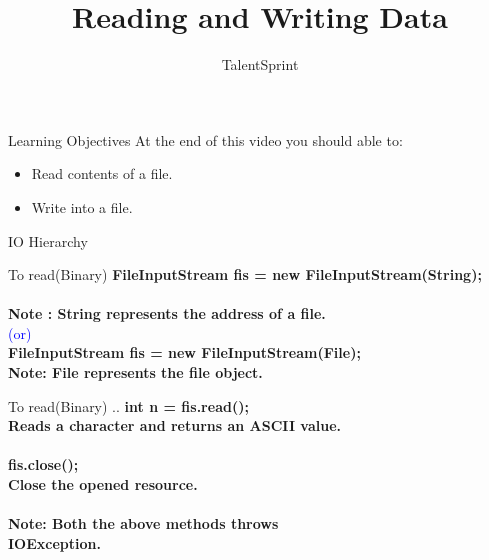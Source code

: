 \documentclass[aspectratio=169,14pt,usenames,dvipsnames]{beamer}
\title[Reading and Writing Data]{Reading and Writing Data}
\newcommand\tab[1][1cm]{\hspace*{#1}}
\begin{document}
{\1
\begin{frame} \vspace{35pt}

\subtitle{TalentSprint}
\maketitle
\end{frame}
}

\begin{frame}{Learning Objectives}
At the end of this video you should able to:
\begin{itemize}
\item Read contents of a file.
\item Write into a file.
\end{itemize}
\end{frame}


\begin{frame}{IO Hierarchy}
\begin{center}
\end{center}
\end{frame}

\begin{frame}{To read(Binary)}
\textbf{FileInputStream fis = new FileInputStream(String);}\\
\vspace{1em}\\
\textbf{Note : String represents the address of a file.}\\
\tab \tab \tab \tab \textcolor{blue}{(or)}\\
\textbf{FileInputStream fis = new FileInputStream(File);}\\
\vspace{1em}
\textbf{Note: File represents the file object.}\\
\end{frame}


\begin{frame}{To read(Binary) ..}
\textbf{int n = fis.read();}\\
\textbf{Reads a character and returns an ASCII value.}\\
\vspace{1em}\\
\textbf{fis.close();}\\
\textbf{Close the opened resource.}\\
\vspace{1em}\\
\textbf{Note: Both the above methods throws}\\
\textbf{IOException.}\\
\end{frame}
\end{document}
